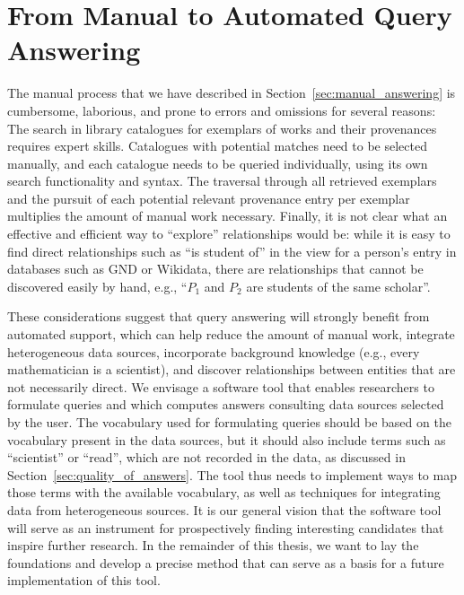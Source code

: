 \section{From Manual to Automated Query Answering}
\label{sec:manual_vs_automated}

The manual process that we have described in Section~\ref{sec:manual_answering}
is cumbersome, laborious, and prone to errors and omissions for several reasons:
The search in library catalogues for exemplars of works and their provenances requires expert skills.
Catalogues with potential matches need to be selected manually,
and each catalogue needs to be queried individually, using its own search functionality and syntax. 
The traversal through all retrieved exemplars and the pursuit of each potential relevant provenance entry per exemplar 
multiplies the amount of manual work necessary.
Finally, it is not clear what an effective and efficient way to \enquote{explore} relationships would be:
while it is easy to find direct relationships such as \enquote{is student of} in the view for a person's entry
in databases such as \gls{GND} or Wikidata, there are relationships that cannot be discovered easily by hand,
e.g., \enquote{$P_1$ and $P_2$ are students of the same scholar}.

These considerations suggest that query answering will
strongly benefit from automated support,
which can help reduce the amount of manual work, integrate heterogeneous data sources,
incorporate background knowledge (e.g., every mathematician is a scientist),
and discover relationships between entities that are not necessarily direct.
We envisage a software tool that enables researchers to formulate queries 
and which computes answers consulting data sources selected by the user.
The vocabulary used for formulating queries should be based on the vocabulary
present in the data sources, but it should also include terms such as \enquote{scientist} or \enquote{read},
which are not recorded in the data, as discussed in
Section~\ref{sec:quality_of_answers}. The tool thus needs to implement ways
to map those terms with the available vocabulary, as well as techniques
for integrating data from heterogeneous sources.
It is our general vision that the software tool will serve as an instrument for prospectively finding interesting
candidates that inspire further research.
In the remainder of this thesis, we want to lay the foundations and develop a precise method
that can serve as a basis for a future implementation of this tool.

